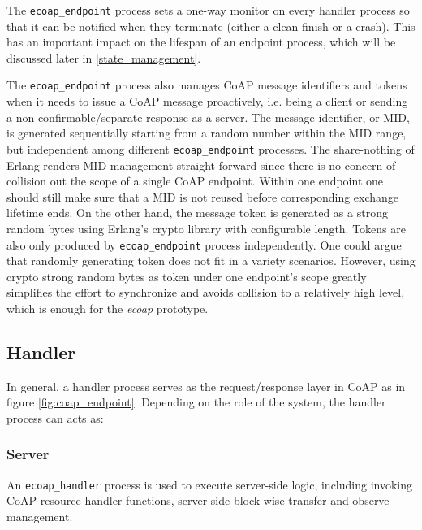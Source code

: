 The \verb|ecoap_endpoint| process sets a one-way monitor on every handler process so that it can be notified when they terminate (either a clean finish or a crash). This has an important impact on the lifespan of an endpoint process, which will be discussed later in \ref{state_management}. 

The \verb|ecoap_endpoint| process also manages CoAP message identifiers and tokens when it needs to issue a CoAP message proactively, i.e. being a client or sending a non-confirmable/separate response as a server. The message identifier, or MID, is generated sequentially starting from a random number within the MID range, but independent among different \verb|ecoap_endpoint| processes. The share-nothing of Erlang renders MID management straight forward since there is no concern of collision out the scope of a single CoAP endpoint. Within one endpoint one should still make sure that a MID is not reused before corresponding exchange lifetime ends. On the other hand, the message token is generated as a strong random bytes using Erlang's crypto library with configurable length. Tokens are also only produced by  \verb|ecoap_endpoint| process independently. One could argue that randomly generating token does not fit in a variety scenarios. However, using crypto strong random bytes as token under one endpoint's scope greatly simplifies the effort to synchronize and avoids collision to a relatively high level, which is enough for the \textit{ecoap} prototype.

\subsection{Handler}\label{coap_handler}

In general, a handler process serves as the request/response layer in CoAP as in figure \ref{fig:coap_endpoint}. Depending on the role of the system, the handler process can acts as:

\subsubsection{Server}

An \verb|ecoap_handler| process is used to execute server-side logic, including invoking CoAP resource handler functions, server-side block-wise transfer and observe management. 

